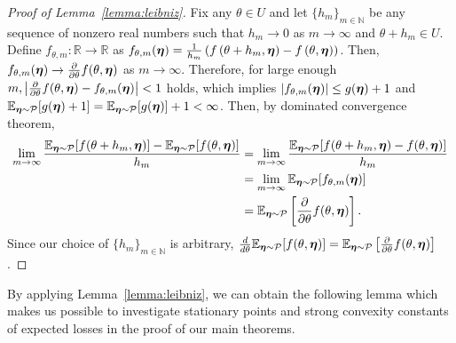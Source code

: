 \begin{proof}[Proof of Lemma~\ref{lemma:leibniz}]
Fix any $\theta \in U$ and let $\{h_m\}_{m \in \mathbb{N}}$ be any sequence of nonzero real numbers such that $h_m \rightarrow 0$ as $m \to \infty$ and $\theta + h_m \in U$.
Define $f_{\theta,m} : \mathbb{R} \rightarrow \mathbb{R}$ as $f_{\theta,m}({\bm{\eta}}) = \frac{1}{h_m}\left(f\left( \theta + h_m,{\bm{\eta}} \right) -f\left( \theta,{\bm{\eta}} \right) \right)$. Then, $f_{\theta,m}({\bm{\eta}}) \rightarrow \frac{\partial}{\partial \theta} f(\theta,{\bm{\eta}})$ as $m \to \infty$. 
Therefore, for large enough $m, \left | \frac{\partial}{\partial \theta} f(\theta,{\bm{\eta}}) - f_{\theta,m}({\bm{\eta}})\right|<1$ holds, which implies $|f_{\theta,m}({\bm{\eta}})| \leq g({\bm{\eta}})+1$ and $\mathbb{E}_{{\bm{\eta}} \sim \mathcal{P}}[g({\bm{\eta}}) +1] = \mathbb{E}_{{\bm{\eta}} \sim \mathcal{P}}[g({\bm{\eta}})] +1 < \infty$. 
Then, by dominated convergence theorem,
\begin{align*}
\lim_{m \rightarrow \infty} \frac{\mathbb{E}_{{\bm{\eta}} \sim \mathcal{P}}[f(\theta+h_m,{\bm{\eta}})] - \mathbb{E}_{{\bm{\eta}} \sim \mathcal{P}} [f(\theta,{\bm{\eta}})]}{h_m} 
&= \lim_{m \rightarrow \infty} \frac{\mathbb{E}_{{\bm{\eta}} \sim \mathcal{P}} [f(\theta+h_m,{\bm{\eta}}) - f(\theta,{\bm{\eta}})]}{h_m}\\
&= \lim_{m \rightarrow \infty} \mathbb{E}_{{\bm{\eta}} \sim \mathcal{P}} [f_{\theta,m}({\bm{\eta}})]\\
&= \mathbb{E}_{{\bm{\eta}} \sim \mathcal{P}} \left[\frac{\partial}{\partial \theta} f(\theta,{\bm{\eta}})\right].
\end{align*}
Since our choice of $\{h_m\}_{m \in \mathbb{N}}$ is arbitrary, $\frac{d}{d\theta} \mathbb{E}_{{\bm{\eta}} \sim \mathcal{P}}[f(\theta, {\bm{\eta}})] = \mathbb{E}_{{\bm{\eta}} \sim \mathcal{P}} \left[\frac{\partial}{\partial \theta} f(\theta,{\bm{\eta}})\right]$.
\end{proof} 

By applying Lemma~\ref{lemma:leibniz}, we can obtain the following lemma which makes us possible to investigate stationary points and strong convexity constants of expected losses in the proof of our main theorems.


